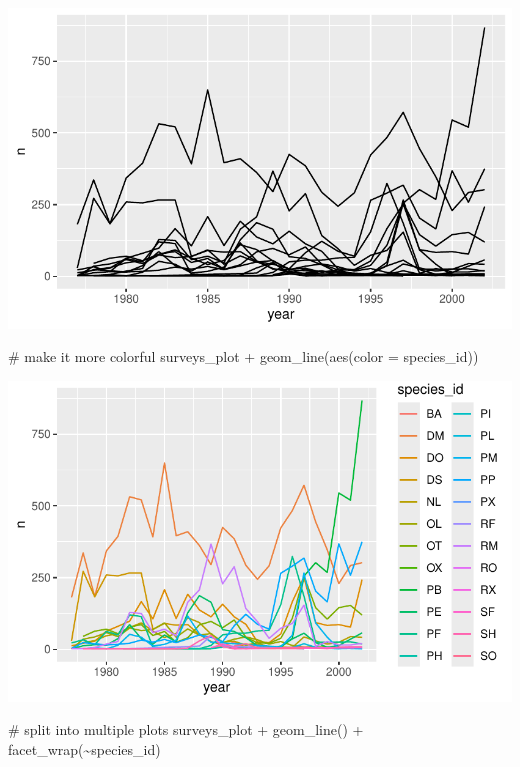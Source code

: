 \documentclass[
  letterpaper,
  DIV=11,
  numbers=noendperiod]{scrreprt}
\newenvironment{Shaded}{\begin{snugshade}}{\end{snugshade}}
\newcommand{\AttributeTok}[1]{\textcolor[rgb]{0.40,0.45,0.13}{#1}}
\newcommand{\CommentTok}[1]{\textcolor[rgb]{0.37,0.37,0.37}{#1}}
\newcommand{\FunctionTok}[1]{\textcolor[rgb]{0.28,0.35,0.67}{#1}}
\newcommand{\NormalTok}[1]{\textcolor[rgb]{0.00,0.23,0.31}{#1}}
\newcommand{\SpecialCharTok}[1]{\textcolor[rgb]{0.37,0.37,0.37}{#1}}
\begin{document}
\includegraphics{src/notebooks/r_files/figure-pdf/unnamed-chunk-48-2.pdf}

\begin{Shaded}
\begin{Highlighting}[]
\CommentTok{\# make it more colorful}
\NormalTok{surveys\_plot }\SpecialCharTok{+} \FunctionTok{geom\_line}\NormalTok{(}\FunctionTok{aes}\NormalTok{(}\AttributeTok{color =}\NormalTok{ species\_id))}
\end{Highlighting}
\end{Shaded}

\includegraphics{src/notebooks/r_files/figure-pdf/unnamed-chunk-48-3.pdf}

\begin{Shaded}
\begin{Highlighting}[]
\CommentTok{\# split into multiple plots}
\NormalTok{surveys\_plot }\SpecialCharTok{+} \FunctionTok{geom\_line}\NormalTok{() }\SpecialCharTok{+} \FunctionTok{facet\_wrap}\NormalTok{(}\SpecialCharTok{\textasciitilde{}}\NormalTok{species\_id)}
\end{Highlighting}
\end{Shaded}
\end{document}
